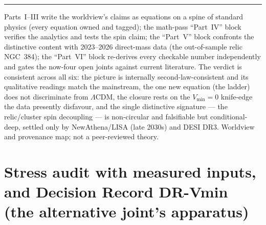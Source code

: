 \documentclass[11pt]{article}
\begin{document}
\vspace{6pt}\hrule\vspace{4pt}
{\small Parts~I--III write the worldview's claims as equations on a spine of standard physics (every equation owned and tagged); the math-pass ``Part~IV'' block verifies the analytics and tests the spin claim; the ``Part~V'' block confronts the distinctive content with 2023--2026 direct-mass data (the out-of-sample relic NGC~384); the ``Part~VI'' block re-derives every checkable number independently and gates the now-four open joints against current literature. The verdict is consistent across all six: the picture is internally second-law-consistent and its qualitative readings match the mainstream, the one new equation (the ladder) does not discriminate from $\Lambda$CDM, the closure rests on the $V_{\min}=0$ knife-edge the data presently disfavour, and the single distinctive signature --- the relic/cluster spin decoupling --- is non-circular and falsifiable but conditional-deep, settled only by NewAthena/LISA (late 2030s) and DESI DR3. Worldview and provenance map; not a peer-reviewed theory.}


\clearpage

\part{Stress audit with measured inputs, and Decision Record DR-Vmin (the alternative joint's apparatus)}
\setcounter{section}{0}\setcounter{equation}{0}\setcounter{figure}{0}

\begin{center}\end{center}
\end{document}
